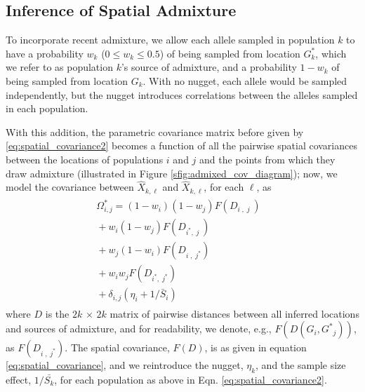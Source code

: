 \documentclass[12pt]{article}
\newcommand{\kadmixsource}[1]{{$G^{*}_{#1}$}}
\newcommand{\identifyadmixsource}[1]{{#1^{*}}}
\begin{document}
\subsection*{Inference of Spatial Admixture}

To incorporate recent admixture, 
we allow each allele sampled in population $k$ to have a probability $w_k$ ($0 \leq w_k \leq 0.5$) of being sampled from location \kadmixsource{k},
which we refer to as population $k$'s source of admixture,
and a probability $1-w_k$ of being sampled from location $G_k$.
With no nugget, each allele would be sampled independently, but the nugget introduces correlations between the alleles sampled in each population.

With this addition, the parametric covariance matrix before given by \eqref{eq:spatial_covariance2}
becomes a function of all the pairwise spatial covariances between the locations of populations $i$ and $j$ and the points from which they draw admixture 
(illustrated in Figure \ref{sfig:admixed_cov_diagram});
now, we model the covariance between $\hat X_{k,\ell}$ and $\hat X_{k,\ell}$, for each $\ell$, as
\begin{align}
\label{eq:admixed_covariance_1}\begin{split}
\identifyadmixsource{\Omega_{i,j}} = 
  (1-w_i)(1-w_j) F(D_{i\;,\;j\;}) &\\
  {} + w_i(1-w_j) F(D_{\identifyadmixsource{i},\;j\;})    &\\
  {} + w_j(1-w_i) F(D_{i\;,\;\identifyadmixsource{j}})    &\\
  {} + w_i w_j F(D_{\identifyadmixsource{i},\;\identifyadmixsource{j}})    &\\
  {} + \delta_{i,j} (\eta_i + 1 / \bar{S}_i) &
\end{split}
\end{align}
where $D$ is the $2k \, \times \, 2k$ matrix of pairwise distances between all inferred locations and sources of admixture, 
and for readability, we denote, e.g., $F(D(G_i,\identifyadmixsource{G}_j))$, as $F(D_{i\;,\;\identifyadmixsource{j}})$.
The spatial covariance, $F(D)$, is as given in equation \eqref{eq:spatial_covariance}, and we reintroduce the nugget, $\eta_k$, and the sample size effect, $1/\bar{S_k}$, for each population as above in Eqn. \eqref{eq:spatial_covariance2}.
\end{document}
